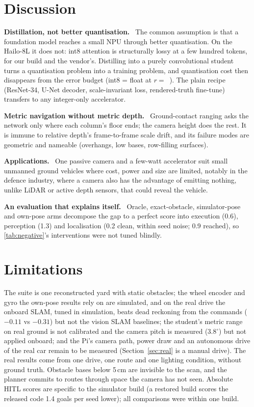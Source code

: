 \documentclass[conference]{IEEEtran}
\newcommand{\hailo}{Hailo-8L}
\newcommand{\keyline}[1]{\smallskip\noindent\textbf{#1}\ }
\begin{document}
\section{Discussion}
\keyline{Distillation, not better quantisation.} The common assumption is that a foundation model reaches a small NPU through
better quantisation. On the \hailo{} it does not: int8 attention is structurally lossy at a few hundred tokens, for our build
and the vendor's. Distilling into a purely convolutional student turns a quantisation problem into a training problem, and
quantisation cost then disappears from the error budget (int8 = float at $r=$~\chipfidvfivepfifty). The plain recipe
(ResNet-34, U-Net decoder, scale-invariant loss, rendered-truth fine-tune) transfers to any integer-only accelerator.

\keyline{Metric navigation without metric depth.} Ground-contact ranging asks the network only where each column's floor
ends; the camera height does the rest. It is immune to relative depth's frame-to-frame scale drift, and its failure modes are geometric and nameable (overhangs, low bases, row-filling surfaces).

\keyline{Applications.} One passive camera and a few-watt accelerator suit small unmanned ground vehicles where cost,
power and size are limited, notably in the defence industry, where a camera also has the advantage of emitting nothing,
unlike LiDAR or active depth sensors, that could reveal the vehicle.

\keyline{An evaluation that explains itself.} Oracle, exact-obstacle, simulator-pose and own-pose arms decompose the gap to a
perfect score into execution (0.6), perception (1.3) and localisation (0.2 clean, within seed noise; 0.9 reached), so \cref{tab:negative}'s
interventions were not tuned blindly.

\section{Limitations}
The suite is one reconstructed yard with static obstacles; the wheel encoder and gyro the own-pose results rely on are simulated, and on the real drive the onboard SLAM, tuned in
simulation, beats dead reckoning from the commands ($-0.11$ vs $-0.31$) but not the vision SLAM baselines;
the student's metric range on real ground is not calibrated and the camera pitch is measured (3.8$^\circ$) but not applied onboard; and the Pi's camera path, power draw and
an autonomous drive of the real car remain to be measured (Section~\ref{sec:real} is a manual drive). The real results come from one drive, one route and one lighting condition, without ground truth. Obstacle bases below 5\,cm are
invisible to the scan, and the planner commits to routes through space the camera has not seen. Absolute HITL scores are specific to the simulator build (a restored build scores the released code 1.4 goals per seed lower); all comparisons were within one build.
\end{document}
